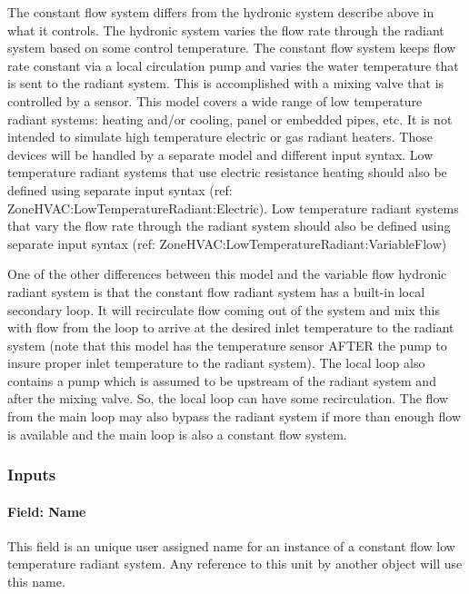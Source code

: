 The constant flow system differs from the hydronic system describe above in what it controls. The hydronic system varies the flow rate through the radiant system based on some control temperature. The constant flow system keeps flow rate constant via a local circulation pump and varies the water temperature that is sent to the radiant system. This is accomplished with a mixing valve that is controlled by a sensor. This model covers a wide range of low temperature radiant systems: heating and/or cooling, panel or embedded pipes, etc. It is not intended to simulate high temperature electric or gas radiant heaters. Those devices will be handled by a separate model and different input syntax. Low temperature radiant systems that use electric resistance heating should also be defined using separate input syntax (ref: ZoneHVAC:LowTemperatureRadiant:Electric). Low temperature radiant systems that vary the flow rate through the radiant system should also be defined using separate input syntax (ref: ZoneHVAC:LowTemperatureRadiant:VariableFlow)

One of the other differences between this model and the variable flow hydronic radiant system is that the constant flow radiant system has a built-in local secondary loop. It will recirculate flow coming out of the system and mix this with flow from the loop to arrive at the desired inlet temperature to the radiant system (note that this model has the temperature sensor AFTER the pump to insure proper inlet temperature to the radiant system). The local loop also contains a pump which is assumed to be upstream of the radiant system and after the mixing valve. So, the local loop can have some recirculation. The flow from the main loop may also bypass the radiant system if more than enough flow is available and the main loop is also a constant flow system.

\subsubsection{Inputs}\label{inputs-6-019}

\paragraph{Field: Name}\label{field-name-6-016}

This field is an unique user assigned name for an instance of a constant flow low temperature radiant system. Any reference to this unit by another object will use this name.

